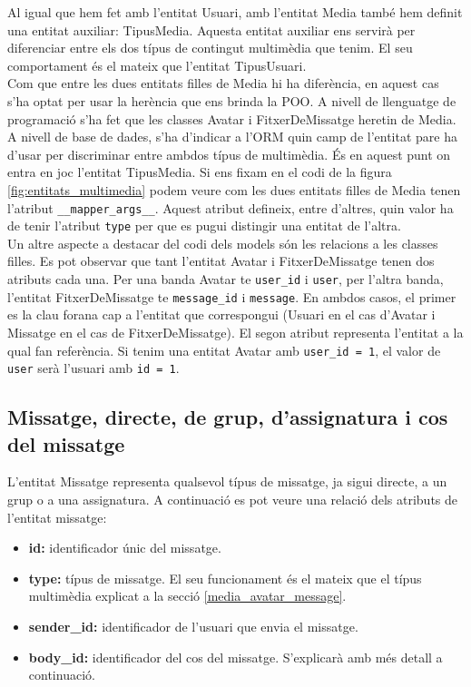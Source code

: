     Al igual que hem fet amb l'entitat Usuari, amb l'entitat Media també hem definit una entitat auxiliar: TipusMedia. Aquesta entitat auxiliar ens servirà per diferenciar entre els dos típus de contingut multimèdia que tenim. El seu comportament és el mateix que l'entitat TipusUsuari.\\
    
    Com que entre les dues entitats filles de Media hi ha diferència, en aquest cas s'ha optat per usar la herència que ens brinda la \ac{POO}. A nivell de llenguatge de programació s'ha fet que les classes Avatar i FitxerDeMissatge heretin de Media. A nivell de base de dades, s'ha d'indicar a l'\ac{ORM} quin camp de l'entitat pare ha d'usar per discriminar entre ambdos típus de multimèdia. És en aquest punt on entra en joc l'entitat TipusMedia. Si ens fixam en el codi de la figura \ref{fig:entitats_multimedia} podem veure com les dues entitats filles de Media tenen l'atribut \texttt{\_\_mapper\_args\_\_}. Aquest atribut defineix, entre d'altres, quin valor ha de tenir l'atribut \texttt{type} per que es pugui distingir una entitat de l'altra.\\
    
    Un altre aspecte a destacar del codi dels models són les relacions a les classes filles. Es pot observar que tant l'entitat Avatar i FitxerDeMissatge tenen dos atributs cada una. Per una banda Avatar te \texttt{user\_id} i \texttt{user}, per l'altra banda, l'entitat FitxerDeMissatge te \texttt{message\_id} i \texttt{message}. En ambdos casos, el primer es la clau forana cap a l'entitat que correspongui (Usuari en el cas d'Avatar i Missatge en el cas de FitxerDeMissatge). El segon atribut representa l'entitat a la qual fan referència. Si tenim una entitat Avatar amb \texttt{user\_id = 1}, el valor de \texttt{user} serà l'usuari amb \texttt{id = 1}.\\
   
    \subsection{Missatge, directe, de grup, d'assignatura i cos del missatge}\label{message_direct_group_subject}
    
    L'entitat Missatge representa qualsevol típus de missatge, ja sigui directe, a un grup o a una assignatura. A continuació es pot veure una relació dels atributs de l'entitat missatge:
    
    \begin{itemize}
    	\item \textbf{id:} identificador únic del missatge.
    	\item \textbf{type:} típus de missatge. El seu funcionament és el mateix que el típus multimèdia explicat a la secció \ref{media_avatar_message}.
    	\item \textbf{sender\_id:} identificador de l'usuari que envia el missatge. 
    	\item \textbf{body\_id:} identificador del cos del missatge. S'explicarà amb més detall a continuació.
    \end{itemize}
    
